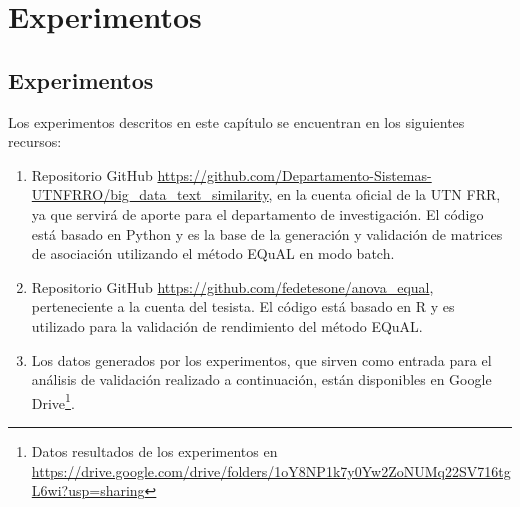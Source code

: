 \chapter*{Experimentos}\label{ch:experimentos}

\section*{Experimentos}
\addtocounter{section}{1}
\setcounter{subsection}{0}

Los experimentos descritos en este capítulo se encuentran en los siguientes recursos:
\begin{enumerate}
	\item Repositorio GitHub \url{https://github.com/Departamento-Sistemas-UTNFRRO/big_data_text_similarity}, en la cuenta oficial de la UTN FRR, ya que servirá de aporte para el departamento de investigación. El código está basado en Python y es la base de la generación y validación de matrices de asociación utilizando el método EQuAL en modo batch.
	\item Repositorio GitHub \url{https://github.com/fedetesone/anova_equal}, perteneciente a la cuenta del tesista. El código está basado en R y es utilizado para la validación de rendimiento del método EQuAL.
	\item Los datos generados por los experimentos, que sirven como entrada para el análisis de validación realizado a continuación, están disponibles en Google Drive\footnote{Datos resultados de los experimentos en \url{https://drive.google.com/drive/folders/1oY8NP1k7y0Yw2ZoNUMq22SV716tgL6wi?usp=sharing}}.
\end{enumerate}






